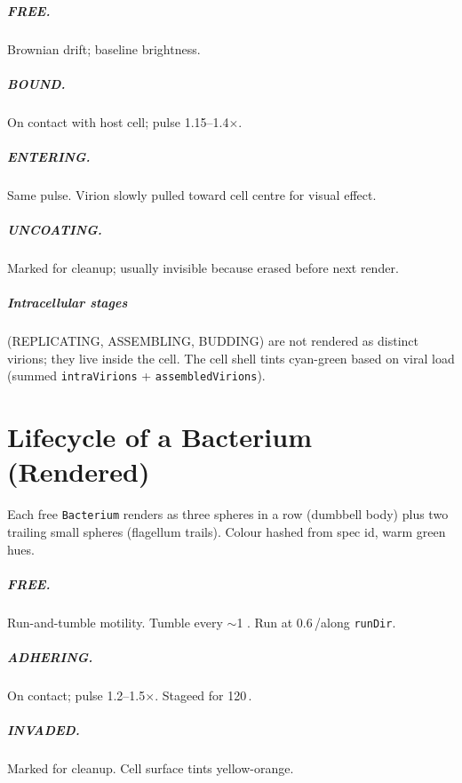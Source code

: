 \documentclass[11pt,letterpaper,twoside,openany]{book}
\newcommand{\code}[1]{\texttt{#1}}
\newcommand{\biosec}{\text{bio-s}}
\newcommand{\wu}{\text{wu}}
\begin{document}
\paragraph{FREE.} Brownian drift; baseline brightness.
\paragraph{BOUND.} On contact with host cell; pulse 1.15--1.4$\times$.
\paragraph{ENTERING.} Same pulse. Virion slowly pulled toward
cell centre for visual effect.
\paragraph{UNCOATING.} Marked for cleanup; usually invisible
because erased before next render.
\paragraph{Intracellular stages} (REPLICATING, ASSEMBLING,
BUDDING) are not rendered as distinct virions; they live inside
the cell. The cell shell tints cyan-green based on viral load
(summed \code{intraVirions} + \code{assembledVirions}).

\chapter{Lifecycle of a Bacterium (Rendered)}
\label{ch:bacterium-life}

Each free \code{Bacterium} renders as three spheres in a row
(dumbbell body) plus two trailing small spheres (flagellum
trails). Colour hashed from spec id, warm green hues.

\paragraph{FREE.} Run-and-tumble motility. Tumble every $\sim$1
\biosec. Run at 0.6\,\wu/\biosec along \code{runDir}.
\paragraph{ADHERING.} On contact; pulse 1.2--1.5$\times$. Stageed
for 120\,\biosec.
\paragraph{INVADED.} Marked for cleanup. Cell surface tints
yellow-orange.
\end{document}
